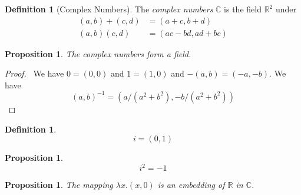 \documentclass{article}
\let\qed\relax
\newtheorem{proposition}[axiom]{Proposition}
\theoremstyle{definition}
\newtheorem{definition}[axiom]{Definition}
\begin{document}
    \begin{definition}[Complex Numbers]
        The \emph{complex numbers} $\mathbb{C}$ is the field $\mathbb{R}^2$ under
        \begin{align*}
            (a,b) + (c,d) & = (a+c,b+d) \\
            (a,b) (c,d) & = (ac-bd, ad+bc)
        \end{align*}
    \end{definition}

    \begin{proposition}
        The complex numbers form a field.
    \end{proposition}

    \begin{proof}
        \pf\ We have $0 = (0,0)$ and $1 = (1,0)$ and $-(a,b) = (-a,-b)$. We have
        \[ (a,b)^{-1} = (a/(a^2 + b^2),-b/(a^2 + b^2)) \] \qed
    \end{proof}

    \begin{definition}
        \[ i = (0,1) \]
    \end{definition}

    \begin{proposition}
        \[ i^2 = -1 \]
    \end{proposition}

    \begin{proposition}
        The mapping $\lambda x.(x,0)$ is an embedding of $\mathbb{R}$ in $\mathbb{C}$.
    \end{proposition}
\end{document}
